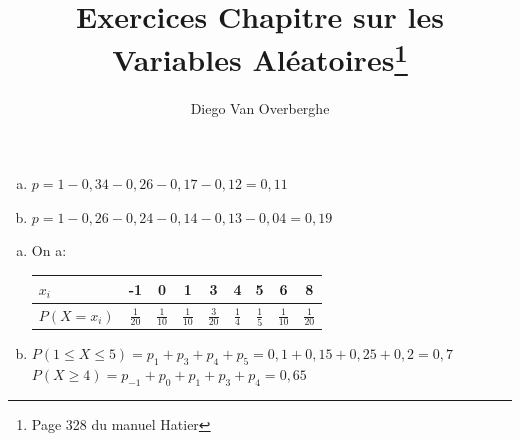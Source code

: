 \documentclass[12pt, a4paper]{article}
\begin{document}
    \title{Exercices Chapitre sur les Variables Aléatoires\footnote{Page 328 du manuel Hatier}}
    \author{Diego Van Overberghe}
    \maketitle
    
    \begin{Exercise}[number={33}]
        \begin{enumerate}[a)]
          \item $p=1-0{,}34-0{,}26-0{,}17-0{,}12=0{,}11$
          \item $p=1-0{,}26-0{,}24-0{,}14-0{,}13-0{,}04=0{,}19$
        \end{enumerate}
    \end{Exercise}

    \begin{Exercise}[number={35}]
      \begin{enumerate}[a)]
        \item On a: 
              \begin{center}\begin{tabular}{ | l | *{8}{c|} }
                \hline
                $x_i$                     & -1             & 0              & 1              & 3              & 4             & 5             & 6              & 8              \\ \hline
                $P(X=x_i)$ \hspace{0.5cm} & $\frac{1}{20}$ & $\frac{1}{10}$ & $\frac{1}{10}$ & $\frac{3}{20}$ & $\frac{1}{4}$ & $\frac{1}{5}$ & $\frac{1}{10}$ & $\frac{1}{20}$ \\ \hline
               \end{tabular}\end{center}
        \item $P(1\leq X\leq 5)=p_1+p_3+p_4+p_5=0{,}1+0{,}15+0{,}25+0{,}2=0{,}7$ \\ $P(X\geq 4)=p_{-1}+p_0+p_1+p_3+p_4=0{,}65$
      \end{enumerate}
    \end{Exercise}
\end{document}
